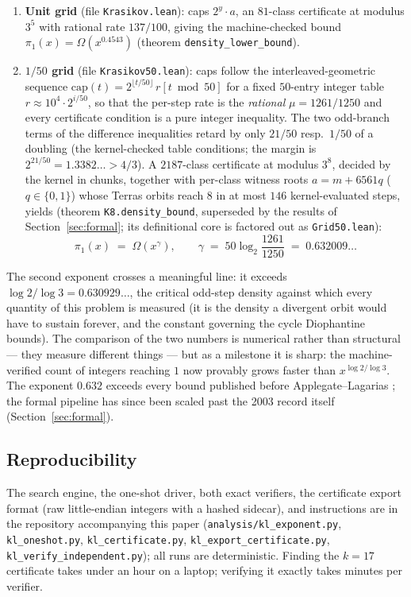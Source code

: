 \documentclass[11pt]{article}
\newcommand{\code}[1]{\texttt{#1}}
\begin{document}
\begin{enumerate}
\item \textbf{Unit grid} (file \code{Krasikov.lean}): caps $2^y \cdot a$,
an $81$-class certificate at modulus $3^5$ with rational rate
$137/100$, giving the machine-checked bound
$\pi_1(x) = \Omega(x^{0.4543})$ (theorem
\code{density\_lower\_bound}).
\item \textbf{$1/50$ grid} (file \code{Krasikov50.lean}): caps follow
the interleaved-geometric sequence
$\mathrm{cap}(t) = 2^{\lfloor t/50\rfloor}\, r[t \bmod 50]$ for a fixed
$50$-entry integer table $r \approx 10^4 \cdot 2^{i/50}$, so that the
per-step rate is the \emph{rational} $\mu = 1261/1250$ and every
certificate condition is a pure integer inequality. The two odd-branch
terms of the difference inequalities retard by only $21/50$
resp.\ $1/50$ of a doubling (the kernel-checked table conditions; the
margin is $2^{21/50} = 1.3382\ldots > 4/3$). A $2187$-class certificate
at modulus $3^8$, decided by the kernel in chunks, together with
per-class witness roots $a = m + 6561q$ ($q \in \{0,1\}$) whose Terras
orbits reach $8$ in at most $146$ kernel-evaluated steps, yields
(theorem \code{K8.density\_bound}, superseded by the results of Section~\ref{sec:formal}; its definitional core is factored out as \code{Grid50.lean}):
\[
\pi_1(x) \;=\; \Omega\!\left(x^{\gamma}\right), \qquad
\gamma \;=\; 50 \log_2\!\frac{1261}{1250} \;=\; 0.632009\ldots
\]
\end{enumerate}

The second exponent crosses a meaningful line: it exceeds
$\log 2/\log 3 = 0.630929\ldots$, the critical odd-step density against
which every quantity of this problem is measured (it is the density a
divergent orbit would have to sustain forever, and the constant
governing the cycle Diophantine bounds). The comparison of the two
numbers is numerical rather than structural --- they measure different
things --- but as a milestone it is sharp: the machine-verified count
of integers reaching $1$ now provably grows faster than
$x^{\log 2/\log 3}$. The exponent $0.632$ exceeds every bound published
before Applegate--Lagarias \cite{applegate-lagarias}; the formal pipeline has since been
scaled past the 2003 record itself (Section~\ref{sec:formal}).

\subsection*{Reproducibility}
The search engine, the one-shot driver, both exact verifiers, the
certificate export format (raw little-endian integers with a hashed
sidecar), and instructions are in the repository accompanying this
paper (\code{analysis/kl\_exponent.py}, \code{kl\_oneshot.py},
\code{kl\_certificate.py}, \code{kl\_export\_certificate.py},
\code{kl\_verify\_independent.py}); all runs are deterministic.
Finding the $k = 17$ certificate takes under an hour on a laptop;
verifying it exactly takes minutes per verifier.
\end{document}
